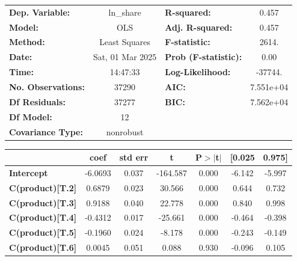 \documentclass[11pt]{article}
\begin{document}
    \begin{center}
\begin{tabular}{lclc}
\toprule
\textbf{Dep. Variable:}    &    ln\_share     & \textbf{  R-squared:         } &     0.457   \\
\textbf{Model:}            &       OLS        & \textbf{  Adj. R-squared:    } &     0.457   \\
\textbf{Method:}           &  Least Squares   & \textbf{  F-statistic:       } &     2614.   \\
\textbf{Date:}             & Sat, 01 Mar 2025 & \textbf{  Prob (F-statistic):} &     0.00    \\
\textbf{Time:}             &     14:47:33     & \textbf{  Log-Likelihood:    } &   -37744.   \\
\textbf{No. Observations:} &       37290      & \textbf{  AIC:               } & 7.551e+04   \\
\textbf{Df Residuals:}     &       37277      & \textbf{  BIC:               } & 7.562e+04   \\
\textbf{Df Model:}         &          12      & \textbf{                     } &             \\
\textbf{Covariance Type:}  &    nonrobust     & \textbf{                     } &             \\
\bottomrule
\end{tabular}
\begin{tabular}{lcccccc}
                          & \textbf{coef} & \textbf{std err} & \textbf{t} & \textbf{P$> |$t$|$} & \textbf{[0.025} & \textbf{0.975]}  \\
\midrule
\textbf{Intercept}        &      -6.0693  &        0.037     &  -164.587  &         0.000        &       -6.142    &       -5.997     \\
\textbf{C(product)[T.2]}  &       0.6879  &        0.023     &    30.566  &         0.000        &        0.644    &        0.732     \\
\textbf{C(product)[T.3]}  &       0.9188  &        0.040     &    22.778  &         0.000        &        0.840    &        0.998     \\
\textbf{C(product)[T.4]}  &      -0.4312  &        0.017     &   -25.661  &         0.000        &       -0.464    &       -0.398     \\
\textbf{C(product)[T.5]}  &      -0.1960  &        0.024     &    -8.178  &         0.000        &       -0.243    &       -0.149     \\
\textbf{C(product)[T.6]}  &       0.0045  &        0.051     &     0.088  &         0.930        &       -0.096    &        0.105     \\

\end{tabular}
\end{center}
\end{document}
